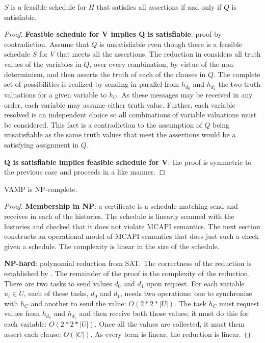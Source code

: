\begin{lemma} \label{lem:sat}
$S$ is a feasible schedule for $H$ that satisfies all assertions if
  and only if $Q$ is satisfiable.
\end{lemma}
\begin{proof}
\textbf{Feasible schedule for V implies Q is satisfiable}: proof by
contradiction. Assume that $Q$ is unsatisfiable even though there is a
feasible schedule $S$ for $V$ that meets all the assertions. The
reduction in  considers all truth values of the
variables in $Q$, over every combination, by virtue of the
non-determinism, and then asserts the truth of each of the clauses in
$Q$. The complete set of possibilities is realized by sending in
parallel from $h_{d_0}$ and $h_{d_1}$ the two truth valuations for a
given variable to $h_C$. As these messages may be received in any
order, each variable may assume either truth value. Further, each
variable resolved is an independent choice so all combinations of
variable valuations must be considered.  This fact is a contradiction
to the assumption of $Q$ being unsatisfiable as the same truth values
that meet the assertions would be a satisfying assignment in $Q$.

\noindent \textbf{Q is satisfiable implies feasible schedule for V}:
the proof is symmetric to the previous case and proceeds in a like
manner.
\end{proof}

\begin{theorem}[NP-complete]
VAMP is NP-complete.
\end{theorem}
\begin{proof}
\noindent\textbf{Membership in NP}: a certificate is a schedule
matching send and receives in each of the histories. The schedule is
linearly scanned with the histories and checked that it does not
violate MCAPI semantics. The next section constructs an
operational model of MCAPI semantics that does just such a check given
a schedule. The complexity is linear in the
size of the schedule.

\noindent\textbf{NP-hard}: polynomial reduction from SAT. The
correctness of the reduction is established by .
The remainder of the proof is the complexity of the reduction. There
are two tasks to send values $d_0$ and $d_1$ upon request. For each
variable $u_i \in U$, each of these tasks, $d_0$ and $d_1$, needs two
operations: one to synchronize with $h_C$ and another to send the
value: $O(2 * 2 * |U|)$. The task $h_C$ must request values from
$h_{d_0}$ and $h_{d_1}$ and then receive both those values; it must do
this for each variable: $O(2 * 2 * |U|)$.  Once all the values
are collected, it must them assert each clause: $O(|C|)$. As every
term is linear, the reduction is linear.
\end{proof}
